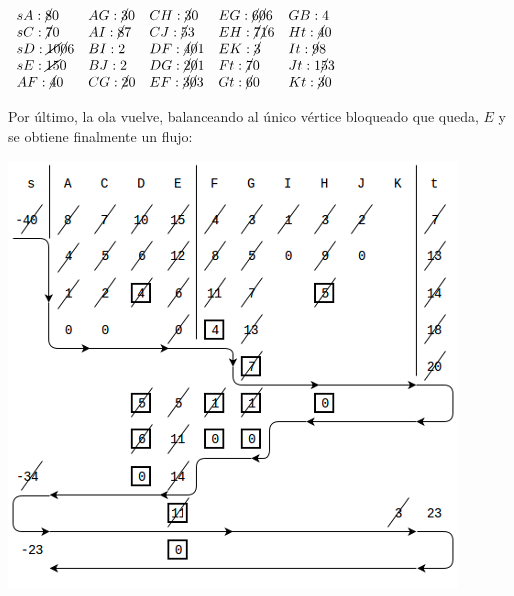 \documentclass[10pt,a4paper]{article}
\begin{document}
\begin{center}
$\begin{array}{lllll} sA:\cancel{8} 0 & AG: \cancel{3}0 & CH: \cancel{3}0 & EG: \cancel{6}\cancel{0}6 & GB:4\\ sC:\cancel{7 } 0 & AI: \cancel{8}7 & CJ: \cancel{5}3 & EH: \cancel{7}\cancel{1}6 & Ht: \cancel{4}0\\ sD:\cancel{10} \cancel{0}6 & BI: 2 & DF:\cancel{4}\cancel{0}1 & EK: \cancel{3} & It: \cancel{9}8\\ sE: \cancel{15} 0 &BJ: 2 & DG: \cancel{2}\cancel{0}1 & Ft: \cancel{7}0 & Jt: 1\cancel{5}3\\ AF: \cancel{4}0 & CG: \cancel{2}0 & EF: \cancel{3}\cancel{0}3 & Gt: \cancel{6}0 & Kt: \cancel{3}0\\ \end{array}$
\end{center}

Por último, la ola vuelve, balanceando al único vértice bloqueado que queda, $E$ y se obtiene finalmente un flujo:

\begin{center}

    \begin{adjustbox}{max size={\textwidth}{\textheight}}
        \includegraphics{definitions/wave_b10.jpg}
        \end{adjustbox}
    
\end{center}
\end{document}
